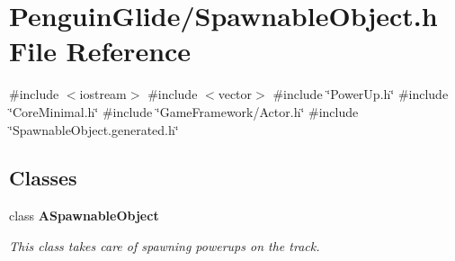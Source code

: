 \section{Penguin\+Glide/\+Spawnable\+Object.h File Reference}
\label{_spawnable_object_8h}
{\ttfamily \#include $<$iostream$>$}\newline
{\ttfamily \#include $<$vector$>$}\newline
{\ttfamily \#include \char`\"{}Power\+Up.\+h\char`\"{}}\newline
{\ttfamily \#include \char`\"{}Core\+Minimal.\+h\char`\"{}}\newline
{\ttfamily \#include \char`\"{}Game\+Framework/\+Actor.\+h\char`\"{}}\newline
{\ttfamily \#include \char`\"{}Spawnable\+Object.\+generated.\+h\char`\"{}}\newline
\subsection*{Classes}
\begin{DoxyCompactItemize}
\item 
class \textbf{ A\+Spawnable\+Object}
\begin{DoxyCompactList}\small\item\em This class takes care of spawning powerups on the track. \end{DoxyCompactList}\end{DoxyCompactItemize}
